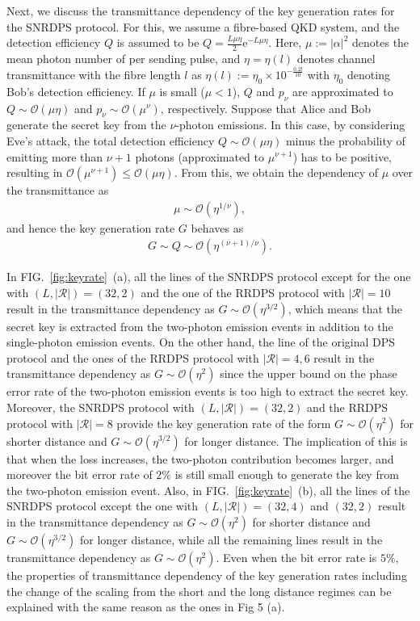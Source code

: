 \documentclass[twocolumn,superscriptaddress,pra,footinbib,notitlepage]{revtex4-1}
\newcommand{\1}{\mbox{1}\hspace{-0.25em}\mbox{l}}
\newcommand{\abs}[1]{\lvert#1\rvert}
\begin{document}
Next, we discuss the transmittance dependency of the key generation rates for the SNRDPS protocol. 
For this, we assume a fibre-based QKD system, and the detection efficiency $Q$ is assumed to be $Q=\frac{L\mu\eta}{2}\mathrm{e}^{-L\mu\eta}$.
Here, $\mu:=\abs{\alpha}^2$ denotes the mean photon number of per sending pulse, and
$\eta=\eta(l)$ denotes channel transmittance with the fibre length $l$ as 
$\eta(l):=\eta_0\times10^{-\frac{0.2 l}{10}}$ with $\eta_0$ denoting Bob's detection efficiency. 
If $\mu$ is small ($\mu<1$), $Q$ and $p_\nu$ are approximated to $Q\sim\mathcal{O}(\mu\eta)$ and $p_\nu\sim\mathcal{O}(\mu^\nu)$, respectively.
Suppose that Alice and Bob generate the secret key from the $\nu$-photon emissions. 
In this case, by considering Eve's attack, the total detection efficiency $Q\sim\mathcal{O}(\mu\eta)$ minus the probability of emitting more than $\nu+1$ photons (approximated to $\mu^{\nu+1}$) has to be positive, resulting in $\mathcal{O}(\mu^{\nu+1})\leq\mathcal{O}(\mu\eta)$.
From this, we obtain the dependency of $\mu$ over the transmittance as
\begin{align}
\mu\sim\mathcal{O}(\eta^{1/\nu}),\label{eq:order_mu}
\end{align}
and hence the key generation rate $G$ behaves as
\begin{align}
G\sim Q\sim\mathcal{O}(\eta^{(\nu+1)/\nu}).\label{eq:order_G}
\end{align}

In FIG.~\ref{fig:keyrate}~(a), all the lines of the SNRDPS protocol except for the one with $(L, \abs{\mathcal{R}})=(32, 2)$ and the one of the RRDPS protocol with $\abs{\mathcal{R}}=10$ result in the transmittance dependency as $G\sim\mathcal{O}(\eta^{3/2})$, which means that the secret key is extracted from the two-photon emission events in addition to the single-photon emission events.
On the other hand, the line of the original DPS protocol and the ones of the RRDPS protocol with $\abs{\mathcal{R}}=4, 6$ result in the transmittance dependency as $G\sim\mathcal{O}(\eta^2)$ since the upper bound on the phase error rate of the two-photon emission events is too high to extract the secret key.
Moreover, the SNRDPS protocol with $(L, \abs{\mathcal{R}})=(32, 2)$ and the RRDPS protocol with $\abs{\mathcal{R}}=8$ provide the key generation rate of the form $G\sim\mathcal{O}(\eta^{2})$ for shorter distance and $G\sim\mathcal{O}(\eta^{3/2})$ for longer distance.
The implication of this is that when the loss increases, the two-photon contribution becomes larger, and moreover the bit error rate of $2\%$ is still small enough to generate the key from the two-photon emission event.
Also, in FIG.~\ref{fig:keyrate}~(b), all the lines of the SNRDPS protocol except the one with $(L, \abs{\mathcal{R}})=(32, 4)$ and $(32, 2)$ result in the transmittance dependency as $G\sim\mathcal{O}(\eta^{2})$ for shorter distance and $G\sim\mathcal{O}(\eta^{3/2})$ for longer distance, while all the remaining lines result in the transmittance dependency as $G\sim\mathcal{O}(\eta^2)$.
Even when the bit error rate is $5\%$, the properties of transmittance dependency of the key generation rates including the change of the scaling from the short and the long distance regimes can be explained with the same reason as the ones in Fig 5 (a).
\end{document}
